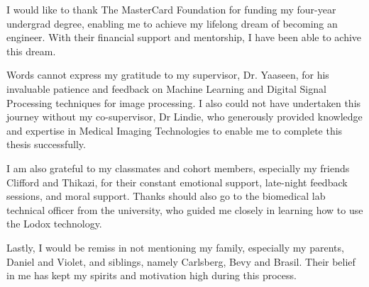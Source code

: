 {}


I would like to thank The MasterCard Foundation for funding my four-year undergrad degree, enabling me to achieve my lifelong dream of becoming an engineer. With their financial support and mentorship, I have been able to achive this dream.

Words cannot express my gratitude to my supervisor, Dr. Yaaseen, for his invaluable patience and feedback on Machine Learning and Digital Signal Processing techniques for image processing. I also could not have undertaken this journey without my co-supervisor, Dr Lindie, who generously provided knowledge and expertise in Medical Imaging Technologies to enable me to complete this thesis successfully.  

I am also grateful to my classmates and cohort members, especially my friends Clifford and Thikazi, for their constant emotional support, late-night feedback sessions, and moral support. Thanks should also go to the biomedical lab technical officer from the university, who guided me closely in learning how to use the Lodox technology. 

Lastly, I would be remiss in not mentioning my family, especially my parents, Daniel and Violet, and siblings, namely Carlsberg, Bevy and Brasil. Their belief in me has kept my spirits and motivation high during this process. 

\clearpage %